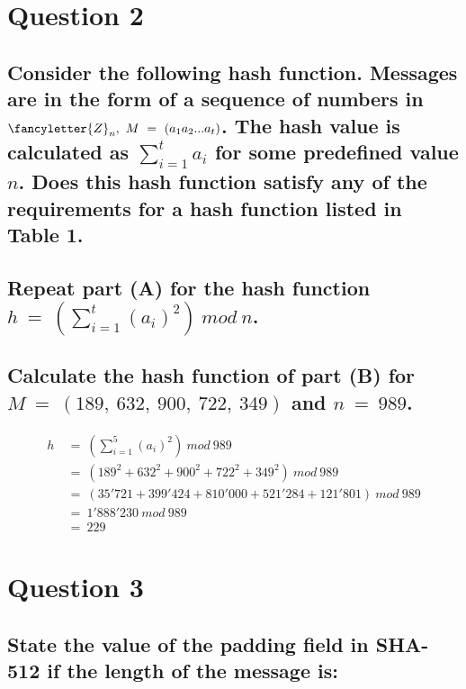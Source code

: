 \documentclass{report}
\begin{document}
	\section{Question 2}
	\startsection
		\renewcommand{\thesubsection}{\thesection.\Alph{subsection}}
		\subsection{Consider the following hash function. Messages are in the form of a sequence of numbers in $\fancyletter{Z}_n, \ M \ = \ (a_1a_2...a_t)$. The hash value is calculated as $\sum_{i=1}^t a_i$ for some predefined value $n$. Does this hash function satisfy any of the requirements for a hash function listed in Table 1.}
		\startsubsection
		\closesection
		\subsection{Repeat part (A) for the hash function $h \ = \ \left(\sum_{i=1}^t (a_i)^2\right) \ mod \ n$.}
		\startsubsection
		\closesection
		\subsection{Calculate the hash function of part (B) for $M \ = \ (189, \ 632, \ 900, \ 722, \ 349)$ and $n \ = \ 989$.}
		\vspace*{-2em}
		\begin{align*}
			h \ & = \ \left(\sum_{i=1}^5 (a_i)^2\right) \ mod \ 989 \\
			& = \ (189^2 + 632^2 + 900^2 + 722^2 + 349^2) \ mod \ 989 \\
			& = \ (35'721 + 399'424 + 810'000 + 521'284 + 121'801) \ mod \ 989 \\
			& = \ 1'888'230 \ mod \ 989 \\
			& = \ 229
		\end{align*}
	\closesection
	
	\section{Question 3}
	\startsection
		\renewcommand{\thesubsection}{\thesection.\Alph{subsection}}
		\subsection{State the value of the padding field in SHA-512 if the length of the message is:}
		\startsubsection
\end{document}
